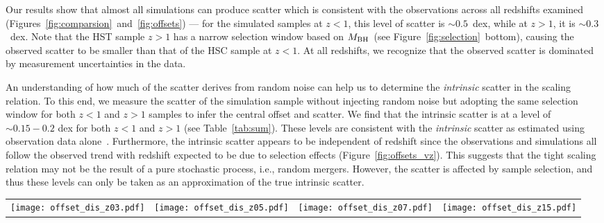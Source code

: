 \documentclass[twocolumn]{aastex631}
\def\mbh{$M_{\rm BH}$}
\begin{document}
Our results show that almost all simulations can produce scatter which is consistent with the observations across all redshifts examined (Figures~\ref{fig:comparsion}~and~\ref{fig:offsets}) --- for the simulated samples at $z<1$, this level of scatter is $\sim0.5$~dex, while at $z>1$, it is $\sim0.3$~dex. Note that the HST sample $z>1$ has a narrow selection window based on \mbh\ (see Figure~\ref{fig:selection}~bottom), causing the observed scatter to be smaller than that of the HSC sample at $z<1$. At all redshifts, we recognize that the observed scatter is dominated by measurement uncertainties in the data. 

An understanding of how much of the scatter derives from random noise can help us to determine the {\it intrinsic} scatter in the scaling relation. To this end, we measure the scatter of the simulation sample without injecting random noise but adopting the same selection window for both $z<1$ and $z>1$ samples to infer the central offset and scatter. We find that the intrinsic scatter is at a level of $\sim0.15-0.2$ dex for both $z<1$ and $z>1$ (see Table~\ref{tab:sum}). These levels are consistent with the {\it intrinsic} scatter as estimated using observation data alone~\citep{Ding2020, Li2021b}. Furthermore, the intrinsic scatter appears to be independent of redshift since the observations and simulations all follow the observed trend with redshift expected to be due to selection effects (Figure~\ref{fig:offsets_vz}). This suggests that the tight scaling relation may not be the result of a pure stochastic process, i.e., random mergers. However, the scatter is affected by sample selection, and thus these levels can only be taken as an approximation of the true intrinsic scatter.

\begin{figure*}
\centering
\begin{tabular}{c c c c}
\hspace*{-0.4cm} 
{\texttt{[image: offset\_dis\_z03.pdf]}}&
\hspace*{-0.4cm} 
{\texttt{[image: offset\_dis\_z05.pdf]}}&
\hspace*{-0.4cm} 
{\texttt{[image: offset\_dis\_z07.pdf]}}&
\hspace*{-0.4cm} 
{\texttt{[image: offset\_dis\_z15.pdf]}}\\
\end{tabular}
\caption{\label{fig:offsets} 
Colored histograms show the offset distributions for all simulated samples. The mean value and standard deviation of each are summarized in Table~\ref{tab:sum}. The vertical dashed lines indicate the corresponding mean value for each distribution. The mean values for the observed sample (i.e., yellow lines) are also given in each panel. To address the effect of noise, the offset distributions of the simulation without adding noise are also shown by the open black histograms.
For the MBII simulation, the sample at redshift 0.6 is used to compare with other samples at $z=0.5$ and $z=0.7$. 
}
\end{figure*} 
\end{document}
